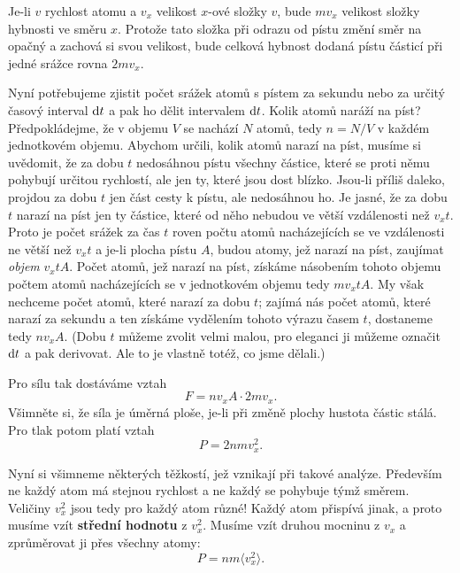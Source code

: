     Je-li \(v\) rychlost atomu a \(v_x\) velikost \(x\)-ové složky \(v\), bude \(mv_x\) velikost
    složky hybnosti ve směru \(x\). Protože tato složka při odrazu od pístu změní směr na opačný a
    zachová si svou velikost, bude celková hybnost dodaná pístu částicí při jedné srážce rovna
    \(2mv_x\).

    Nyní potřebujeme zjistit počet srážek atomů s pístem za sekundu nebo za určitý časový interval
    \(\dif t\) a pak ho dělit intervalem \(\dif t\). Kolik atomů naráží na píst? Předpokládejme, že
    v objemu \(V\) se nachází \(N\) atomů, tedy \(n = N/V\) v každém jednotkovém objemu. Abychom
    určili, kolik atomů narazí na píst, musíme si uvědomit, že za dobu \(t\) nedosáhnou pístu
    všechny částice, které se proti němu pohybují určitou rychlostí, ale jen ty, které jsou dost
    blízko. Jsou-li příliš daleko, projdou za dobu \(t\) jen část cesty k pístu, ale nedosáhnou ho.
    Je jasné, že za dobu \(t\) narazí na píst jen ty částice, které od něho nebudou ve větší
    vzdálenosti než \(v_xt\). Proto je počet srážek za čas \(t\) roven počtu atomů nacházejících se
    ve vzdálenosti ne větší než \(v_xt\) a je-li plocha pístu \(A\), budou atomy, jež narazí na
    píst, zaujímat \emph{objem} \(v_xtA\). Počet atomů, jež narazí na píst, získáme násobením tohoto
    objemu počtem atomů nacházejících se v jednotkovém objemu tedy \(mv_xtA\). My však nechceme
    počet atomů, které narazí za dobu \(t\); zajímá nás počet atomů, které narazí za sekundu a ten
    získáme vydělením tohoto výrazu časem \(t\), dostaneme tedy \(nv_xA\). (Dobu \(t\) můžeme zvolit
    velmi malou, pro eleganci ji můžeme označit \(\dif t\) a pak derivovat. Ale to je vlastně totéž,
    co jsme dělali.)

    Pro sílu tak dostáváme vztah
    \begin{equation}\label{fyz:eq614}
      F=nv_xA\cdot2mv_x.
    \end{equation}
    Všimněte si, že síla je úměrná ploše, je-li při změně plochy hustota částic stálá. Pro tlak
    potom platí vztah
    \begin{equation}\label{fyz:eq615}
      P=2nmv^2_x.
    \end{equation}
   
    Nyní si všimneme některých těžkostí, jež vznikají při takové analýze. Především ne každý atom má
    stejnou rychlost a ne každý se pohybuje týmž směrem. Veličiny \(v_x^2\) jsou tedy pro každý atom
    různé! Každý atom přispívá jinak, a proto musíme vzít \textbf{střední hodnotu} z \(v_x^2\).
    Musíme vzít druhou mocninu z \(v_x\) a zprůměrovat ji přes všechny atomy:
    \begin{equation}\label{fyz:eq616}
      P=nm\langle v^2_x\rangle.
    \end{equation}

